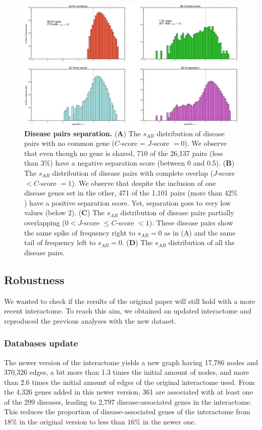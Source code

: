 \documentclass[letterpaper]{article}
\begin{document}
		\begin{figure}[!t]
			\hspace{-1.8cm}
			\vspace{-1cm}
			\includegraphics[scale=.35]{images/s_AB_histograms.eps}
			\caption{\label{fig:s_AB histogram}
			{\bf Disease pairs separation.}
			({\bf A}) The $s_{AB}$ distribution of disease pairs with no common gene ($C$-score = $J$-score $= 0$). We
			observe that even though no gene is shared, 710 of the 26,137 pairs (less than $3\%$) have a negative
			separation score (between 0 and 0.5).
			({\bf B}) The $s_{AB}$ distribution of disease pairs with complete overlap ($J$-score $< C$-score $= 1$).
			We observe that despite the inclusion of one disease genes set in the other, 471 of the 1,101 pairs
			(more than $42\%$) have a positive separation score. Yet, separation goes to very low values (below 2).
			({\bf C}) The $s_{AB}$ distribution of disease pairs partially overlapping ($0 < J$-score $ \leq C$-score $< 1$).
			These disease pairs show the same spike of frequency right to $s_{AB} = 0$ as in (A) and the same tail of frequency
			left to $s_{AB} = 0$.
			({\bf D}) The $s_{AB}$ distribution of all the disease pairs.
			}
		\end{figure}

	\subsection{Robustness}
	We wanted to check if the results of the original paper will still hold with a more recent interactome.
	To reach this aim, we obtained an updated interactome and reproduced the previous analyses with the
	new dataset.

		\subsubsection{Databases update}
		The newer version of the interactome yields a new graph having 17,786 nodes and 370,326 edges, a bit more
		than 1.3 times the initial amount of nodes, and more than 2.6 times the initial amount of edges of the
		original interactome used. From the 4,326 genes added in this newer version, 361 are associated with at
		least one of the 299 diseases, leading to 2,797 disease-associated genes in the interactome. This reduces
		the proportion of disease-associated genes of the interactome from $18\%$ in the original version to less
		than $16\%$ in the newer one.
\end{document}
